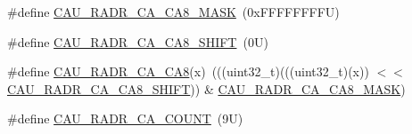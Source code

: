 \begin{DoxyCompactItemize}
\item 
\#define \mbox{\hyperlink{group___c_a_u___register___masks_ga0becdc994c7da7ab67251bd2da040493}{C\+A\+U\+\_\+\+R\+A\+D\+R\+\_\+\+C\+A\+\_\+\+C\+A8\+\_\+\+M\+A\+SK}}~(0x\+F\+F\+F\+F\+F\+F\+F\+F\+U)
\item 
\#define \mbox{\hyperlink{group___c_a_u___register___masks_ga5dde041188525dacccc86994f3b4a62c}{C\+A\+U\+\_\+\+R\+A\+D\+R\+\_\+\+C\+A\+\_\+\+C\+A8\+\_\+\+S\+H\+I\+FT}}~(0\+U)
\item 
\#define \mbox{\hyperlink{group___c_a_u___register___masks_ga60e97a6dd9f8f0ba91c511ee4b8cb438}{C\+A\+U\+\_\+\+R\+A\+D\+R\+\_\+\+C\+A\+\_\+\+C\+A8}}(x)~(((uint32\+\_\+t)(((uint32\+\_\+t)(x)) $<$$<$ \mbox{\hyperlink{group___c_a_u___register___masks_ga5dde041188525dacccc86994f3b4a62c}{C\+A\+U\+\_\+\+R\+A\+D\+R\+\_\+\+C\+A\+\_\+\+C\+A8\+\_\+\+S\+H\+I\+FT}})) \& \mbox{\hyperlink{group___c_a_u___register___masks_ga0becdc994c7da7ab67251bd2da040493}{C\+A\+U\+\_\+\+R\+A\+D\+R\+\_\+\+C\+A\+\_\+\+C\+A8\+\_\+\+M\+A\+SK}})
\item 
\#define \mbox{\hyperlink{group___c_a_u___register___masks_gaea05bce2ea606f2b462fd8b8992c2e9f}{C\+A\+U\+\_\+\+R\+A\+D\+R\+\_\+\+C\+A\+\_\+\+C\+O\+U\+NT}}~(9\+U)
\end{DoxyCompactItemize}
